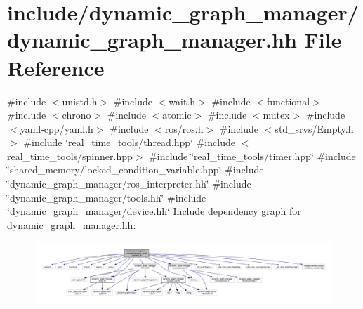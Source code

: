 \hypertarget{dynamic__graph__manager_8hh}{}\section{include/dynamic\+\_\+graph\+\_\+manager/dynamic\+\_\+graph\+\_\+manager.hh File Reference}
\label{dynamic__graph__manager_8hh}
{\ttfamily \#include $<$unistd.\+h$>$}\newline
{\ttfamily \#include $<$wait.\+h$>$}\newline
{\ttfamily \#include $<$functional$>$}\newline
{\ttfamily \#include $<$chrono$>$}\newline
{\ttfamily \#include $<$atomic$>$}\newline
{\ttfamily \#include $<$mutex$>$}\newline
{\ttfamily \#include $<$yaml-\/cpp/yaml.\+h$>$}\newline
{\ttfamily \#include $<$ros/ros.\+h$>$}\newline
{\ttfamily \#include $<$std\+\_\+srvs/\+Empty.\+h$>$}\newline
{\ttfamily \#include \char`\"{}real\+\_\+time\+\_\+tools/thread.\+hpp\char`\"{}}\newline
{\ttfamily \#include $<$real\+\_\+time\+\_\+tools/spinner.\+hpp$>$}\newline
{\ttfamily \#include \char`\"{}real\+\_\+time\+\_\+tools/timer.\+hpp\char`\"{}}\newline
{\ttfamily \#include \char`\"{}shared\+\_\+memory/locked\+\_\+condition\+\_\+variable.\+hpp\char`\"{}}\newline
{\ttfamily \#include \char`\"{}dynamic\+\_\+graph\+\_\+manager/ros\+\_\+interpreter.\+hh\char`\"{}}\newline
{\ttfamily \#include \char`\"{}dynamic\+\_\+graph\+\_\+manager/tools.\+hh\char`\"{}}\newline
{\ttfamily \#include \char`\"{}dynamic\+\_\+graph\+\_\+manager/device.\+hh\char`\"{}}\newline
Include dependency graph for dynamic\+\_\+graph\+\_\+manager.\+hh\+:
\nopagebreak
\begin{figure}[H]
\begin{center}
\leavevmode
\includegraphics[width=350pt]{dynamic__graph__manager_8hh__incl}
\end{center}
\end{figure}
